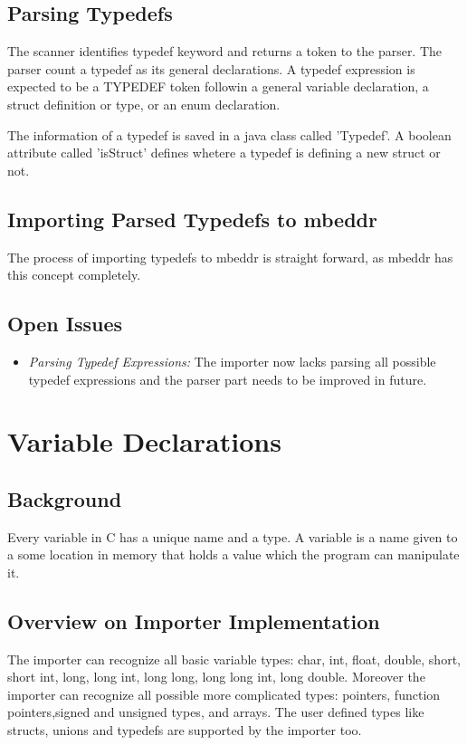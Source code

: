 \documentclass[titlepage]{article}
\begin{document}
\subsection{Parsing Typedefs}
The scanner identifies typedef keyword and returns a token to the parser. The parser count a typedef as its general declarations. A typedef expression is expected to be a TYPEDEF token followin a general variable declaration, a struct definition or type, or an enum declaration.

The information of a typedef is saved in a java class called 'Typedef'. A boolean attribute called 'isStruct' defines whetere a typedef is defining a new struct or not. 
\subsection{Importing Parsed Typedefs to mbeddr}
The process of importing typedefs to mbeddr is straight forward, as mbeddr has this concept completely. 
\subsection{Open Issues}
\begin{itemize}
\item \emph{Parsing Typedef Expressions:} The importer now lacks parsing all possible typedef expressions and the parser part needs to be improved in future.
\end{itemize}


\section{Variable Declarations}
\subsection{Background}
Every variable in C has a unique name and a type. A variable is a name given to a some location in memory that holds a value which the program can manipulate it. 
\subsection{Overview on Importer Implementation}
The importer can recognize all basic variable types: char, int, float, double, short, short int, long, long int, long long, long long int, long double. Moreover the importer can recognize all possible more complicated types: pointers, function pointers,signed and unsigned types, and arrays. The user defined types like structs, unions and typedefs are supported by the importer too.
\end{document}
